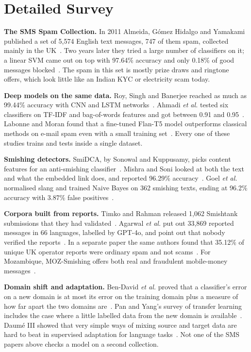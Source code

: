 \section{Detailed Survey}

\textbf{The SMS Spam Collection.} In 2011 Almeida, G\'omez Hidalgo and Yamakami published a set of 5,574 English text messages, 747 of them spam, collected mainly in the UK~\cite{almeida2011contributions}. Two years later they tried a large number of classifiers on it; a linear SVM came out on top with 97.64\% accuracy and only 0.18\% of good messages blocked~\cite{almeida2013towards}. The spam in this set is mostly prize draws and ringtone offers, which look little like an Indian KYC or electricity scam today.

\textbf{Deep models on the same data.} Roy, Singh and Banerjee reached as much as 99.44\% accuracy with CNN and LSTM networks~\cite{roy2020deep}. Ahmadi \textit{et al.} tested six classifiers on TF-IDF and bag-of-words features and got between 0.91 and 0.95~\cite{ahmadi2025llm}. Labonne and Moran found that a fine-tuned Flan-T5 model outperforms classical methods on e-mail spam even with a small training set~\cite{labonne2023spamt5}. Every one of these studies trains and tests inside a single dataset.

\textbf{Smishing detectors.} SmiDCA, by Sonowal and Kuppusamy, picks content features for an anti-smishing classifier~\cite{sonowal2018smidca}. Mishra and Soni looked at both the text and what the embedded link does, and reported 96.29\% accuracy~\cite{mishra2020smishing}. Goel \textit{et al.} normalised slang and trained Naive Bayes on 362 smishing texts, ending at 96.2\% accuracy with 3.87\% false positives~\cite{goel2024ml}.

\textbf{Corpora built from reports.} Timko and Rahman released 1,062 Smishtank submissions that they had validated~\cite{timko2024smishing}. Agarwal \textit{et al.} put out 33,869 reported messages in 66 languages, labelled by GPT-4o, and point out that nobody verified the reports~\cite{agarwal2025fishing}. In a separate paper the same authors found that 35.12\% of unique UK operator reports were ordinary spam and not scams~\cite{agarwal2026overview}. For Mozambique, MOZ-Smishing offers both real and fraudulent mobile-money messages~\cite{ali2025moz}.

\textbf{Domain shift and adaptation.} Ben-David \textit{et al.} proved that a classifier's error on a new domain is at most its error on the training domain plus a measure of how far apart the two domains are~\cite{bendavid2010theory}. Pan and Yang's survey of transfer learning includes the case where a little labelled data from the new domain is available~\cite{pan2010survey}. Daum\'e III showed that very simple ways of mixing source and target data are hard to beat in supervised adaptation for language tasks~\cite{daume2007frustratingly}. Not one of the SMS papers above checks a model on a second collection.

